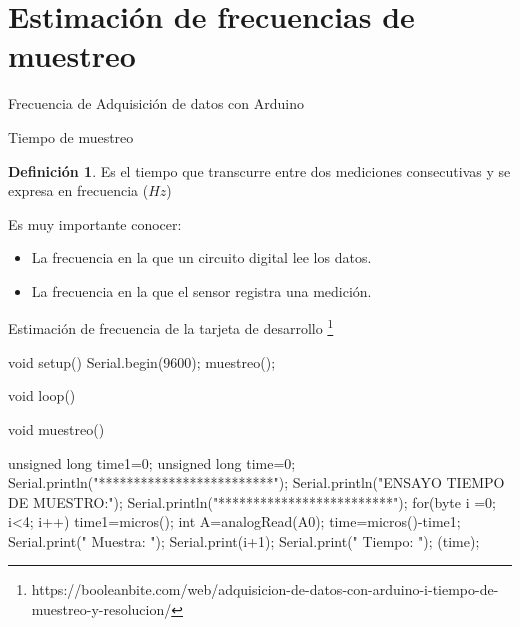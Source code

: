\documentclass{beamer}
\theoremstyle{definition}
\newtheorem{defn}{Definici\'{o}n}[section]
\begin{document}
\begin{frame}

\end{frame}

\section{Estimación de frecuencias de muestreo}

\begin{frame}[fragile]{Frecuencia de Adquisición de datos con Arduino}

{Tiempo de muestreo}

\begin{defn}
Es el tiempo que transcurre entre dos mediciones consecutivas y se expresa en frecuencia ($Hz$)
\end{defn}

Es muy importante conocer:
\begin{itemize}
	\item La frecuencia en la que un circuito digital lee los datos.
 	\item La frecuencia en la que el sensor registra una medición.
\end{itemize}




\end{frame}



\begin{frame}[fragile]{Estimación de frecuencia de la tarjeta de desarrollo \footnote{https://booleanbite.com/web/adquisicion-de-datos-con-arduino-i-tiempo-de-muestreo-y-resolucion/}}

\tiny
\begin{verbatimtab}
void setup(){
	Serial.begin(9600);
	muestreo();
}

void loop(){
}

void muestreo(){

	unsigned long time1=0;
	unsigned long time=0;
	Serial.println("*************************");
  	Serial.println("ENSAYO TIEMPO DE MUESTRO:");
  	Serial.println("*************************");
  	for(byte i =0; i<4; i++){
    	time1=micros();
    	int A=analogRead(A0);
    	time=micros()-time1;
    	Serial.print(" Muestra: ");
    	Serial.print(i+1);
    	Serial.print(" Tiempo: ");
    	(time);
  	}

}
\end{verbatimtab}

\end{frame}
\end{document}
